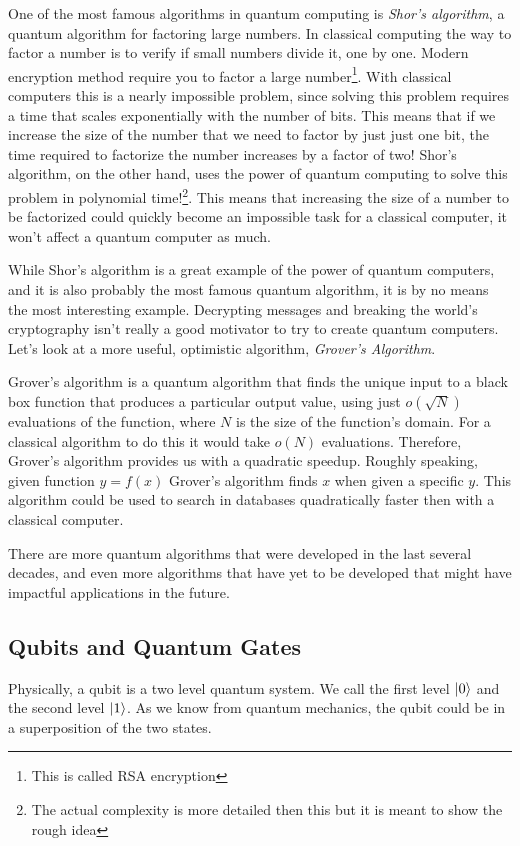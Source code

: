 One of the most famous algorithms in quantum computing is \textit{Shor's algorithm}, a quantum algorithm for factoring large numbers. In classical computing the way to factor a number is to verify if small numbers divide it, one by one. Modern encryption method require you to factor a large number\footnote{This is called RSA encryption}. With classical computers this is a nearly impossible problem, since solving this problem requires a time that scales exponentially with the number of bits. This means that if we increase the size of the number that we need to factor by just just one bit, the time required to factorize the number increases by a factor of two! Shor's algorithm, on the other hand, uses the power of quantum computing to solve this problem in polynomial time!\footnote{The actual complexity is more detailed then this but it is meant to show the rough idea}. This means that increasing the size of a number to be factorized could quickly become an impossible task for a classical computer, it won't affect a quantum computer as much. 

While Shor's algorithm is a great example of the power of quantum computers, and it is also probably the most famous quantum algorithm, it is by no means the most interesting example. Decrypting messages and breaking the world's cryptography isn't really a good motivator to try to create quantum computers. Let's look at a more useful, optimistic algorithm, \textit{Grover's Algorithm}.

Grover's algorithm is a quantum algorithm that finds the unique input to a black box function that produces a particular output value, using just $o(\sqrt {N})$ evaluations of the function, where $N$ is the size of the function's domain. For a classical algorithm to do this it would take $o(N)$ evaluations. Therefore, Grover's algorithm provides us with a quadratic speedup. Roughly speaking, given function $y = f(x)$ Grover's algorithm finds $x$ when given a specific $y$. This algorithm could be used to search in databases quadratically faster then with a classical computer.

There are more quantum algorithms that were developed in the last several decades, and even more algorithms that have yet to be developed that might have impactful applications in the future.

\subsection{Qubits and Quantum Gates}
Physically, a qubit is a two level quantum system. We call the first level $\ket{0}$ and the second level $\ket{1}$. As we know from quantum mechanics, the qubit could be in a superposition of the two states.

